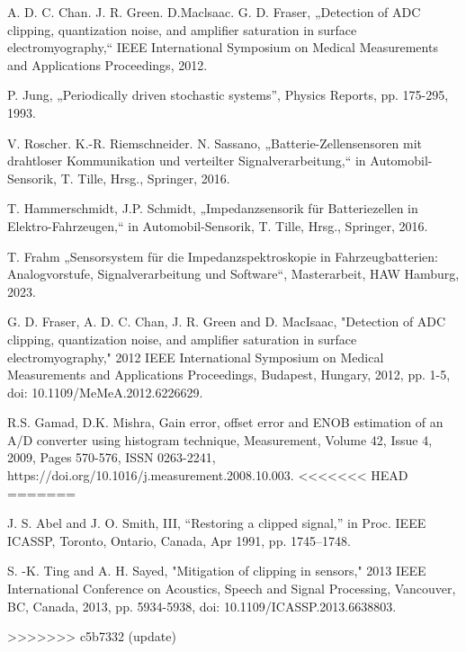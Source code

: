\begin{thebibliography}{[99]}
	A. D. C. Chan. J. R. Green. D.Maclsaac. G. D. Fraser, „Detection of ADC clipping, quantization noise, and amplifier saturation in surface electromyography,“ IEEE International Symposium on Medical Measurements and Applications Proceedings, 2012.
	
	P. Jung, „Periodically driven stochastic systems”, Physics Reports,  pp. 175-295, 1993.
	
	V. Roscher. K.-R. Riemschneider. N. Sassano, „Batterie-Zellensensoren mit drahtloser Kommunikation und verteilter Signalverarbeitung,“ in Automobil-Sensorik, T. Tille, Hrsg., Springer, 2016.
	
	T. Hammerschmidt, J.P. Schmidt, „Impedanzsensorik für Batteriezellen in Elektro-Fahrzeugen,“ in Automobil-Sensorik, T. Tille, Hrsg., Springer, 2016.
	
	T. Frahm „Sensorsystem für die Impedanzspektroskopie in Fahrzeugbatterien: Analogvorstufe, Signalverarbeitung und Software“, Masterarbeit, HAW Hamburg, 2023.
	
	G. D. Fraser, A. D. C. Chan, J. R. Green and D. MacIsaac, "Detection of ADC clipping, quantization noise, and amplifier saturation in surface electromyography," 2012 IEEE International Symposium on Medical Measurements and Applications Proceedings, Budapest, Hungary, 2012, pp. 1-5, doi: 10.1109/MeMeA.2012.6226629.
	
	R.S. Gamad, D.K. Mishra,
	Gain error, offset error and ENOB estimation of an A/D converter using histogram technique,
	Measurement,
	Volume 42, Issue 4,
	2009,
	Pages 570-576,
	ISSN 0263-2241,
	https://doi.org/10.1016/j.measurement.2008.10.003.
<<<<<<< HEAD
=======
	
	J. S. Abel and J. O. Smith, III, “Restoring a clipped signal,” in
	Proc. IEEE ICASSP, Toronto, Ontario, Canada, Apr 1991, pp.
	1745–1748.	

	S. -K. Ting and A. H. Sayed, "Mitigation of clipping in sensors," 2013 IEEE International Conference on Acoustics, Speech and Signal Processing, Vancouver, BC, Canada, 2013, pp. 5934-5938, doi: 10.1109/ICASSP.2013.6638803.


	
>>>>>>> c5b7332 (update)
\end{thebibliography}
	

 
 